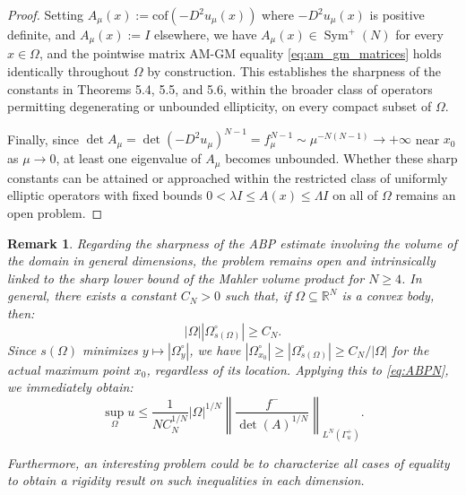 \documentclass{article}
\newtheorem{remark}[theorem]{Remark}
\numberwithin{equation}{section}
\begin{document}
\begin{proof}
\noindent Setting $A_\mu(x) := \mathrm{cof}(-D^2 u_\mu(x))$ where $-D^2u_\mu(x)$ is positive definite, and $A_\mu(x) := I$ elsewhere, we have $A_\mu(x)\in\operatorname{Sym}^+(N)$ for every $x\in\Omega$, and the pointwise matrix AM-GM equality \eqref{eq:am_gm_matrices} holds identically throughout $\Omega$ by construction. This establishes the sharpness of the constants in Theorems 5.4, 5.5, and 5.6, within the broader class of operators permitting degenerating or unbounded ellipticity, on every compact subset of $\Omega$.

\noindent Finally, since $\det A_\mu = \det(-D^2u_\mu)^{N-1} = f_\mu^{N-1} \sim \mu^{-N(N-1)} \to +\infty$ near $x_0$ as $\mu\to0$, at least one eigenvalue of $A_\mu$ becomes unbounded. Whether these sharp constants can be attained or approached within the restricted class of uniformly elliptic operators with fixed bounds $0<\lambda I\le A(x)\le\Lambda I$ on all of $\Omega$ remains an open problem.
\end{proof}

\begin{remark}
Regarding the sharpness of the ABP estimate involving the volume of the domain in general dimensions, the problem remains open and intrinsically linked to the sharp lower bound of the Mahler volume product for $N \ge 4$. In general, there exists a constant $C_N > 0$ such that, if $\Omega \subseteq \mathbb{R}^N$ is a convex body, then:
\[
|\Omega||\Omega^\circ_{s(\Omega)}| \ge C_N.
\]
Since $s(\Omega)$ minimizes $y \mapsto |\Omega^\circ_y|$, we have $|\Omega^\circ_{x_0}| \ge |\Omega^\circ_{s(\Omega)}| \ge C_N / |\Omega|$ for the actual maximum point $x_0$, regardless of its location. Applying this to \eqref{eq:ABPN}, we immediately obtain:
\begin{equation}\label{eq:ABPN_volume}
\sup_\Omega u \le \frac{1}{N C_N^{1/N}}|\Omega|^{1/N} \left\| \frac{f^-}{\det(A)^{1/N}} \right\|_{L^N(\Gamma^+_u)}.
\end{equation}

\noindent Furthermore, an interesting problem could be to characterize all cases of equality to obtain a rigidity result on such inequalities in each dimension.
\end{remark}
\end{document}
